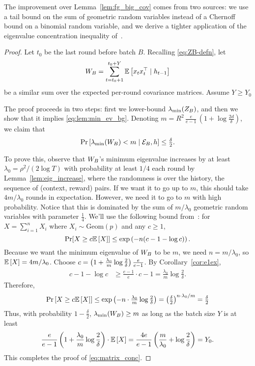 The improvement over Lemma~\ref{lem:fg_big_cov} comes from two sources: we use a tail bound on the sum of
  geometric random variables instead of a Chernoff bound on a binomial random
  variable, and we derive a tighter application of the eigenvalue concentration
inequality of~\citet{tropp2012user}.

\begin{proof}
Let $t_0$ be the last round before batch $B$. Recalling \eqref{eq:ZB-defn}, let
\[ W_B = \sum_{t=t_0+1}^{t_0+Y} \mathbb{E}\left[x_t x_t^{\top} \;|\; h_{t-1}\right] \]
be a similar sum over the expected per-round covariance matrices. Assume $Y\geq Y_0$

The proof proceeds in two steps: first we lower-bound $\lambda_{\min}(Z_B)$, and then we show that it implies \eqref{eq:lem:min_ev_bg}. Denoting
    $ m = R^2\,\tfrac{e}{e-1}\,(1+\log \tfrac{2d}{\delta})$,
we claim that
\begin{align}\label{eq:matrix_conc}
    \Pr\left[\lambda_{\min}(W_B) < m \;|\; \mathcal{E}_B,h\right] \le \tfrac{\delta}{2}.
\end{align}

To prove this, observe that $W_B$'s minimum eigenvalue increases by at least $\lambda_0
  = \rho^2/(2\log T)$ with probability at least $1/4$ each round by
  Lemma~\ref{lem:eig_increase}, where the randomness is over the history, \ie the
  sequence of (context, reward) pairs. If we want it to go up to $m$, this
  should take $4m/\lambda_0$ rounds in expectation. However, we need it to go to
  $m$ with high probability. Notice that this is dominated by the sum of
  $m/\lambda_0$ geometric random variables with parameter $\frac{1}{4}$. We'll
  use the following bound from~\citet{janson2017tail}: for $X = \sum_{i=1}^n X_i$
  where $X_i \sim \text{Geom}(p)$ and any $c \ge 1$,
  \[
    \Pr[X \ge c\mathbb{E}\left[X\right]] \le \exp\left(-n(c - 1 - \log c)\right).
  \]
  Because we want the minimum eigenvalue of $W_B$ to be $m$, we need $n =
  m/\lambda_0$, so $\mathbb{E}\left[X\right] = 4m/\lambda_0$. Choose  $c =
  \left(1+\frac{\lambda_0}{m} \log \tfrac{2}{\delta}\right) \tfrac{e}{e-1}$. By
  Corollary~\ref{cor:e1ex},
  \begin{align*}
    c - 1 - \log c &\ge \tfrac{e-1}{e} \cdot c - 1 = \tfrac{\lambda_0}{m} \log \tfrac{2}{\delta}.
  \end{align*}
  Therefore,
  \[
    \Pr\left[X \ge c\mathbb{E}\left[X\right]\right] \le \exp\left(-n \cdot \tfrac{\lambda_0}{m} \log
    \tfrac{2}{\delta}\right) = \left(\tfrac{\delta}{2}\right)^{n \cdot \lambda_0/m} =
    \tfrac{\delta}{2}
  \]
  Thus, with probability $1 - \frac{\delta}{2}$, $\lambda_{\min}(W_B) \ge m$ as long as the batch size $Y$ is at least
  \[
    \frac{e}{e-1} \left(1 + \frac{\lambda_0}{m} \log \frac{2}{\delta}\right) \cdot
    \mathbb{E}\left[X\right] = \frac{4e}{e-1} \left(\frac{m}{\lambda_0} + \log \frac{2}{\delta}\right) = Y_0.
  \]
  This completes the proof of \eqref{eq:matrix_conc}.


\end{proof}
